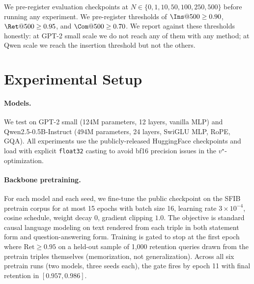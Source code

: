 \documentclass[11pt,a4paper]{article}
\newcommand{\Ret}{\text{Ret}}
\begin{document}
We pre-register evaluation checkpoints at $N \in \{0, 1, 10, 50, 100,
250, 500\}$ before running any experiment. We pre-register thresholds
of $\Ins@500 \ge 0.90$, $\Ret@500 \ge 0.95$, and $\Com@500 \ge 0.70$.
We report against these thresholds honestly: at GPT-2 small scale we
do not reach any of them with any method; at Qwen scale we reach the
insertion threshold but not the others.

\section{Experimental Setup}

\paragraph{Models.} We test on GPT-2 small (124M parameters, 12 layers,
vanilla MLP) and Qwen2.5-0.5B-Instruct (494M parameters, 24 layers,
SwiGLU MLP, RoPE, GQA). All experiments use the publicly-released
HuggingFace checkpoints and load with explicit \texttt{float32} casting
to avoid bf16 precision issues in the $v^\star$-optimization.

\paragraph{Backbone pretraining.} For each model and each seed, we fine-tune
the public checkpoint on the SFIB pretrain corpus for at most 15 epochs
with batch size 16, learning rate $3 \times 10^{-4}$, cosine schedule,
weight decay $0$, gradient clipping $1.0$. The objective is standard
causal language modeling on text rendered from each triple in both
statement form and question-answering form. Training is gated to stop
at the first epoch where $\Ret \ge 0.95$ on a held-out sample of
1{,}000 retention queries drawn from the pretrain triples themselves
(memorization, not generalization). Across all six pretrain runs (two
models, three seeds each), the gate fires by epoch 11 with final
retention in $[0.957, 0.986]$.
\end{document}
